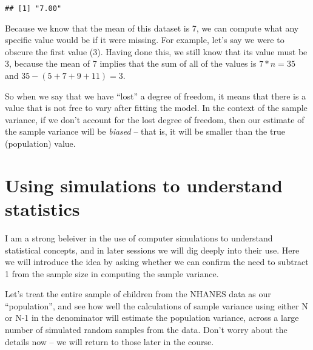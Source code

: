 \documentclass[]{book}
\theoremstyle{definition}
\theoremstyle{definition}
\theoremstyle{definition}
\theoremstyle{remark}
\begin{document}
\begin{verbatim}
## [1] "7.00"
\end{verbatim}

Because we know that the mean of this dataset is 7, we can compute what
any specific value would be if it were missing. For example, let's say
we were to obscure the first value (3). Having done this, we still know
that its value must be 3, because the mean of 7 implies that the sum of
all of the values is \(7 * n = 35\) and \(35 - (5 + 7 + 9 + 11) = 3\).

So when we say that we have ``lost'' a degree of freedom, it means that
there is a value that is not free to vary after fitting the model. In
the context of the sample variance, if we don't account for the lost
degree of freedom, then our estimate of the sample variance will be
\emph{biased} -- that is, it will be smaller than the true (population)
value.

\section{Using simulations to understand
statistics}\label{using-simulations-to-understand-statistics}

I am a strong beleiver in the use of computer simulations to understand
statistical concepts, and in later sessions we will dig deeply into
their use. Here we will introduce the idea by asking whether we can
confirm the need to subtract 1 from the sample size in computing the
sample variance.

Let's treat the entire sample of children from the NHANES data as our
``population'', and see how well the calculations of sample variance
using either N or N-1 in the denominator will estimate the population
variance, across a large number of simulated random samples from the
data. Don't worry about the details now -- we will return to those later
in the course.
\end{document}
